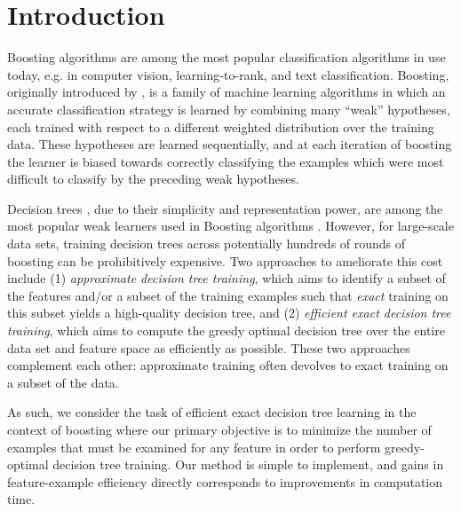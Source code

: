 \section{Introduction}\label{introduction}

Boosting algorithms are among the most popular classification
algorithms in use today, e.g. in computer vision, learning-to-rank,
and text classification.  Boosting, originally introduced by
\citet{Schapire90thestrength, Freund:1995:BWL:220262.220446,
  Freund:1996:ENB:3091696.3091715}, is a family of machine learning
algorithms in which an accurate classification strategy is learned by
combining many ``weak'' hypotheses, each trained with respect to a
different weighted distribution over the training data.  These
hypotheses are learned sequentially, and at each iteration of boosting
the learner is biased towards correctly classifying the examples which
were most difficult to classify by the preceding weak hypotheses.

Decision trees \citep{Quinlan:1993:CPM:152181}, due to their simplicity
and representation power, are among the most popular weak learners
used in Boosting algorithms \citep{Freund:1996:ENB:3091696.3091715,
  Quinlan:1996:BBC:1892875.1892983}.  However, for large-scale data
sets, training decision trees across potentially hundreds of rounds of
boosting can be prohibitively expensive.  Two approaches to ameliorate
this cost include
(1) \emph{approximate decision tree training},
which aims to identify a subset of the
features and/or a subset of the training examples such that
\emph{exact} training on this subset yields a high-quality decision
tree,
and (2)
\emph{efficient exact decision tree training},
which aims to compute the greedy optimal decision tree over the entire data
set and feature space as efficiently as possible.
These two approaches complement each other:
approximate training often devolves to exact
training on a subset of the data.

  As such, we
consider the task of efficient exact decision tree learning in the
context of boosting where our primary objective is to minimize the
number of examples that must be examined for any feature in order to
perform greedy-optimal decision tree training. 
Our method
is simple to implement, and gains in feature-example efficiency directly corresponds to improvements in computation time.


